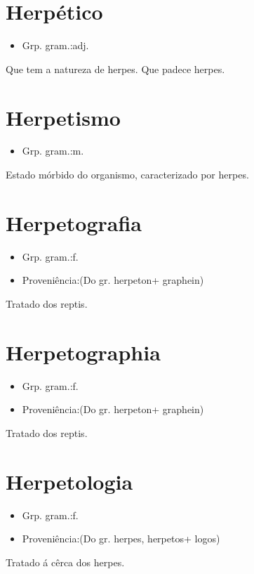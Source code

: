 \documentclass{article}
\begin{document}
\section{Herpético}
\begin{itemize}
\item {Grp. gram.:adj.}
\end{itemize}
Que tem a natureza de herpes.
Que padece herpes.
\section{Herpetismo}
\begin{itemize}
\item {Grp. gram.:m.}
\end{itemize}
Estado mórbido do organismo, caracterizado por herpes.
\section{Herpetografia}
\begin{itemize}
\item {Grp. gram.:f.}
\end{itemize}
\begin{itemize}
\item {Proveniência:(Do gr. \textunderscore herpeton\textunderscore  + \textunderscore graphein\textunderscore )}
\end{itemize}
Tratado dos reptis.
\section{Herpetographia}
\begin{itemize}
\item {Grp. gram.:f.}
\end{itemize}
\begin{itemize}
\item {Proveniência:(Do gr. \textunderscore herpeton\textunderscore  + \textunderscore graphein\textunderscore )}
\end{itemize}
Tratado dos reptis.
\section{Herpetologia}
\begin{itemize}
\item {Grp. gram.:f.}
\end{itemize}
\begin{itemize}
\item {Proveniência:(Do gr. \textunderscore herpes\textunderscore , \textunderscore herpetos\textunderscore  + \textunderscore logos\textunderscore )}
\end{itemize}
Tratado á cêrca dos herpes.
\end{document}
